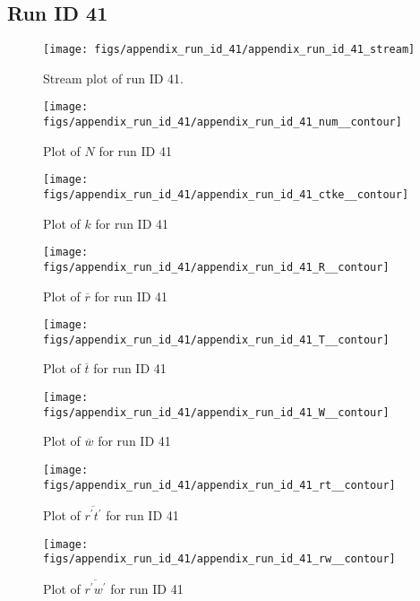 \subsection{Run ID 41}
\begin{figure}[H]
\centering
\texttt{[image: figs/appendix\_run\_id\_41/appendix\_run\_id\_41\_stream]}
\caption{Stream plot of run ID 41.}
\label{fig:appendix_run_id_41_stream}
\end{figure}


\begin{figure}[H]
\centering
\texttt{[image: figs/appendix\_run\_id\_41/appendix\_run\_id\_41\_num\_\_contour]}
\caption{Plot of $N$ for run ID 41}
\label{fig:appendix_run_id_41_num__contour}
\end{figure}


\begin{figure}[H]
\centering
\texttt{[image: figs/appendix\_run\_id\_41/appendix\_run\_id\_41\_ctke\_\_contour]}
\caption{Plot of $k$ for run ID 41}
\label{fig:appendix_run_id_41_ctke__contour}
\end{figure}


\begin{figure}[H]
\centering
\texttt{[image: figs/appendix\_run\_id\_41/appendix\_run\_id\_41\_R\_\_contour]}
\caption{Plot of $\overline{r}$ for run ID 41}
\label{fig:appendix_run_id_41_R__contour}
\end{figure}


\begin{figure}[H]
\centering
\texttt{[image: figs/appendix\_run\_id\_41/appendix\_run\_id\_41\_T\_\_contour]}
\caption{Plot of $\overline{t}$ for run ID 41}
\label{fig:appendix_run_id_41_T__contour}
\end{figure}


\begin{figure}[H]
\centering
\texttt{[image: figs/appendix\_run\_id\_41/appendix\_run\_id\_41\_W\_\_contour]}
\caption{Plot of $\overline{w}$ for run ID 41}
\label{fig:appendix_run_id_41_W__contour}
\end{figure}


\begin{figure}[H]
\centering
\texttt{[image: figs/appendix\_run\_id\_41/appendix\_run\_id\_41\_rt\_\_contour]}
\caption{Plot of $\overline{r^\prime t^\prime}$ for run ID 41}
\label{fig:appendix_run_id_41_rt__contour}
\end{figure}


\begin{figure}[H]
\centering
\texttt{[image: figs/appendix\_run\_id\_41/appendix\_run\_id\_41\_rw\_\_contour]}
\caption{Plot of $\overline{r^\prime w^\prime}$ for run ID 41}
\label{fig:appendix_run_id_41_rw__contour}
\end{figure}


